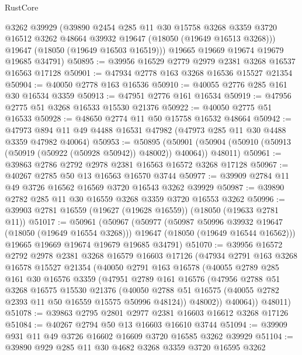 \begin{lexlean}{RustCore}
\begin{coremodule}
        @3262
        @39929
        (@39890
          @2454
          @285
          @11
          @30
          @15758
          @3268
          @3359
          @3720
          @16512
          @3262
          @48664
          @39932
          @19647
          (@18050 (@19649 @16513 @3268)))
        @19647
        (@18050 (@19649 @16503 @16519)))
      @19665
      @19669
      @19674
      @19679
      @19685
      @34791)
@50895 := @39956 @16529 @2779 @2979 @2381 @3268 @16537 @16563 @17128
@50901 := @47934 @2778 @163 @3268 @16536 @15527 @21354
@50904 := @40050 @2778 @163 @16536
@50910 := @40055 @2776 @285 @161 @30 @16534 @3359
@50913 := @47951 @2776 @161 @16534
@50919 := @47956 @2775 @51 @3268 @16533 @15530 @21376
@50922 := @40050 @2775 @51 @16533
@50928 := @48650 @2774 @11 @50 @15758 @16532 @48664
@50942 := @47973 @894 @11 @49 @4488 @16531 @47982 (@47973 @285 @11 @30 @4488 @3359 @47982 @40064)
@50953 := @50895
    (@50901 (@50904 (@50910 (@50913 (@50919 (@50922 (@50928 @50942)) @48002)) @40064)) @48011)
@50961 := @39863 @2786 @2792 @2978 @2381 @16563 @16572 @3268 @17128
@50967 := @40267 @2785 @50 @13 @16563 @16570 @3744
@50977 := @39909 @2784 @11 @49 @3726 @16562 @16569 @3720 @16543 @3262 @39929
@50987 := @39890 @2782 @285 @11 @30 @16559 @3268 @3359 @3720 @16553 @3262
@50996 := @39903 @2781 @16559 (@19627 (@19628 @16559)) (@18050 (@19633 @2781 @11))
@51017 := @50961
    (@50967
      (@50977
        (@50987 @50996 @39932 @19647 (@18050 (@19649 @16554 @3268)))
        @19647
        (@18050 (@19649 @16544 @16562)))
      @19665
      @19669
      @19674
      @19679
      @19685
      @34791)
@51070 := @39956
    @16572
    @2792
    @2978
    @2381
    @3268
    @16579
    @16603
    @17126
    (@47934
      @2791
      @163
      @3268
      @16578
      @15527
      @21354
      (@40050
        @2791
        @163
        @16578
        (@40055
          @2789
          @285
          @161
          @30
          @16576
          @3359
          (@47951
            @2789
            @161
            @16576
            (@47956
              @2788
              @51
              @3268
              @16575
              @15530
              @21376
              (@40050 @2788 @51 @16575 (@40055 @2782 @2393 @11 @50 @16559 @15575 @50996 @48124))
              @48002))
          @40064))
      @48011)
@51078 := @39863 @2795 @2801 @2977 @2381 @16603 @16612 @3268 @17126
@51084 := @40267 @2794 @50 @13 @16603 @16610 @3744
@51094 := @39909 @931 @11 @49 @3726 @16602 @16609 @3720 @16585 @3262 @39929
@51104 := @39890 @929 @285 @11 @30 @4682 @3268 @3359 @3720 @16595 @3262

\end{coremodule}
\end{lexlean}
